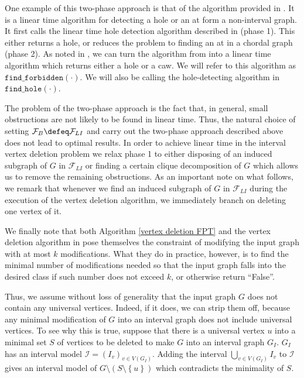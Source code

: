 \documentclass{article}
\begin{document}
    One example of this two-phase approach is
    that of the algorithm provided in \cite{aux1}.
    It is a linear time algorithm for detecting a hole
    or an at form a non-interval graph.
    It first calls the linear time hole detection algorithm
    described in \cite{aux2} (phase 1). 
    This either returns
    a hole, or reduces the problem to finding an at in a 
    chordal graph (phase 2).
    As noted in \cite{main}, we can 
    turn the algorithm from
    \cite{aux1} into a linear time 
    algorithm which returns either
    a hole or a caw. We will
    refer to this algorithm 
    as $\texttt{find\_forbidden}\left(\cdot\right)$.
    We will also be calling the
    hole-detecting algorithm
    in \cite{aux2}
    $\texttt{find\_hole}\left(\cdot\right)$.

    The problem of the two-phase approach is the fact that,
    in general, small obstructions are not likely to
    be found in linear time. 
    Thus, the natural choice
    of setting $\mathcal{F}_{B} \defeq \mathcal{F}_{LI}$
    and carry out the two-phase
    approach described above
    does not lead to optimal
    results.
    In order to achieve linear
    time in the interval vertex deletion problem
    we relax phase 1 to either disposing of
    an induced subgraph of $G$ in $\mathcal{F}_{LI}$
    or finding a certain clique decomposition
    of $G$ which allows us to remove
    the remaining obstructions.
    As an important note on what
    follows, we remark
    that whenever we
    find an induced subgraph of $G$ 
    in $\mathcal{F}_{LI}$ 
    during the execution
    of the vertex deletion
    algorithm, we immediately
    branch on deleting one vertex of it.

    We finally note that
    both Algorithm \ref{vertex deletion FPT}
    and the vertex deletion algorithm in \cite{main}
    pose themselves the constraint
    of modifying the input graph
    with at most $k$ modifications.
    What they do in practice, however,
    is to find the minimal number
    of modifications needed so that
    the input graph falls into the
    desired class if such number
    does not exceed $k$, or otherwise
    return ``False''.
    
    Thus, we assume 
    without loss of generality
    that the input graph
    $G$ does not contain
    any universal vertices.
    Indeed, if it does, 
    we can strip them off,
    because any minimal
    modification of $G$ 
    into an interval graph
    does not include
    universal vertices.
    To see why this is true,
    suppose that there is a 
    universal vertex $u$ into 
    a minimal set $S$ of 
    vertices to be deleted
    to make $G$ into an
    interval graph $G_{I}$.
    $G_{I}$ has an interval
    model $\mathcal{I} = \left(I_{v}\right)_{v \in V\left(G_{I}\right)}$.
    Adding the interval
    $\bigcup_{v \in V\left(G_{I}\right)} I_{v}$
    to $\mathcal{I}$ gives
    an interval model
    of $G \setminus \left(S \setminus \left\{u\right\}\right)$
    which contradicts
    the minimality of
    $S$.
    
\end{document}
